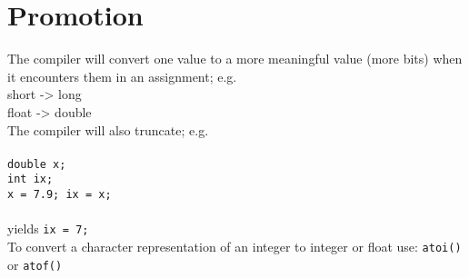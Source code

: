 \documentclass{article}
\begin{document}
\section{Promotion}

The compiler will convert one value to a more meaningful value (more
bits) when it encounters them in an assignment; e.g.\\
short -> long \\
float -> double \\
The compiler will also truncate; e.g.\\\\
{\tt double x;\\
int ix;\\
x = 7.9; ix = x;}\\\\
yields {\tt ix = 7;}\\

To convert a character representation of an integer to integer or
float use:  {\tt atoi()} or {\tt atof()}
\end{document}
